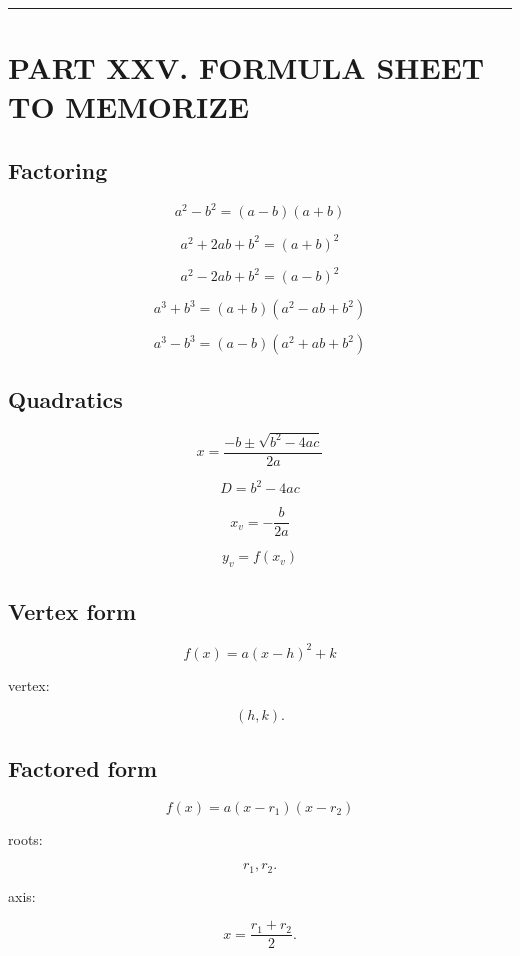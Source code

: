 \documentclass[
]{article}
\begin{document}
\begin{center}\rule{0.5\linewidth}{0.5pt}\end{center}

\section{PART XXV. FORMULA SHEET TO
MEMORIZE}\label{part-xxv.-formula-sheet-to-memorize}

\subsection{Factoring}\label{factoring}

\[
\boxed{a^2-b^2=(a-b)(a+b)}
\]

\[
\boxed{a^2+2ab+b^2=(a+b)^2}
\]

\[
\boxed{a^2-2ab+b^2=(a-b)^2}
\]

\[
\boxed{a^3+b^3=(a+b)(a^2-ab+b^2)}
\]

\[
\boxed{a^3-b^3=(a-b)(a^2+ab+b^2)}
\]

\subsection{Quadratics}\label{quadratics}

\[
\boxed{x=\frac{-b\pm\sqrt{b^2-4ac}}{2a}}
\]

\[
\boxed{D=b^2-4ac}
\]

\[
\boxed{x_v=-\frac b{2a}}
\]

\[
\boxed{y_v=f(x_v)}
\]

\subsection{Vertex form}\label{vertex-form-1}

\[
\boxed{f(x)=a(x-h)^2+k}
\]

vertex:

\[
\boxed{(h,k)}.
\]

\subsection{Factored form}\label{factored-form-1}

\[
\boxed{f(x)=a(x-r_1)(x-r_2)}
\]

roots:

\[
\boxed{r_1,r_2}.
\]

axis:

\[
\boxed{x=\frac{r_1+r_2}{2}}.
\]
\end{document}
